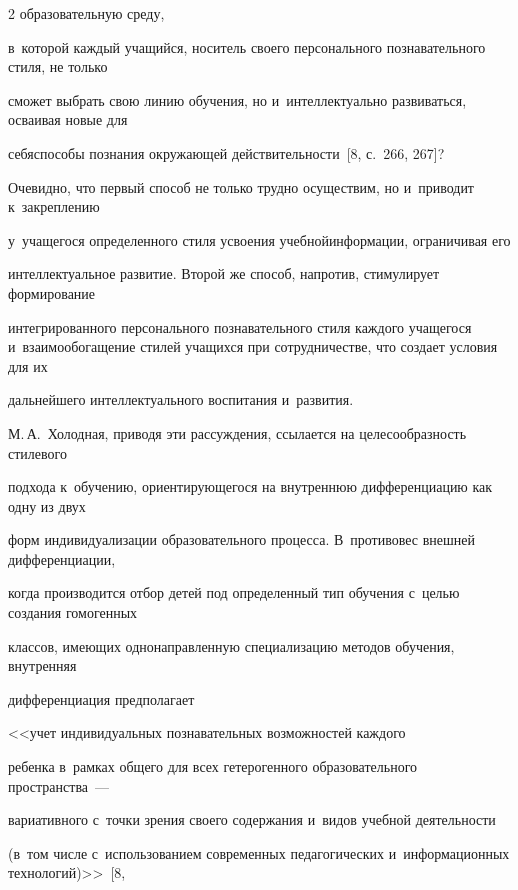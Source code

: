 \begin{multicols}{2}
образовательную  среду,\linebreak


в~которой каждый учащийся, носитель своего персонального познавательного стиля, не только


сможет выбрать свою линию обучения, но и~интеллектуально развиваться, осваивая новые для


себя\linebreak \mbox{способы} познания окружающей действитель\-ности~[8, с.~266, 267]?





   Очевидно, что первый способ не только трудно осуществим, но и~приводит к~закреплению


у~уча\-щегося определенного стиля усвоения учебной\linebreak информа\-ции, ограничивая его


интеллектуальное развитие. Второй же способ, напротив, стимулирует формирование


интегрированного персонального познавательного стиля каждого учащегося и~взаимообогащение стилей учащихся при сотрудничестве, что создает условия для их


дальнейшего интеллектуального воспитания и~развития.





   М.\,А.~Холодная, приводя эти рассуждения, ссылается на целесообразность стилевого


подхода к~обучению, ориентирующегося на внутреннюю дифференциацию как одну из двух


форм индивидуализации образовательного процесса. В~противовес внешней дифференциации,


когда производится отбор детей под определенный тип обучения с~целью создания гомогенных


классов, имеющих однонаправленную специализацию методов обуче\-ния, внутренняя


дифференциация предполагает\linebreak


 <<учет индивидуальных познавательных возможностей каждого


ребенка в~рамках общего для всех гетероген\-ного образовательного пространства~---


вариативного с~точки зрения своего содержания и~видов учебной деятельности


(в~том чис\-ле с~использованием современных педагогических и~информационных технологий)>>~[8,



\end{multicols}

